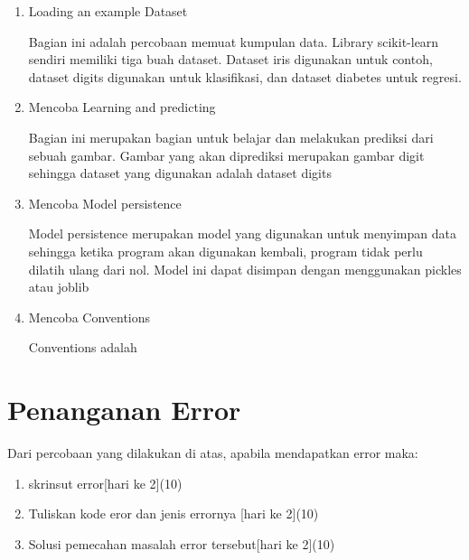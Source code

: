 \begin{enumerate}
	\item
	      Loading an example Dataset
	      \par \setlength{\parindent}{5ex}
	      Bagian ini adalah percobaan memuat kumpulan data. Library scikit-learn sendiri memiliki tiga buah dataset. Dataset iris digunakan untuk contoh, dataset digits digunakan untuk klasifikasi, dan dataset diabetes untuk regresi.
	      
	\item
	      Mencoba Learning and predicting
	      \par \setlength{\parindent}{5ex}
	      Bagian ini merupakan bagian untuk belajar dan melakukan prediksi dari sebuah gambar. Gambar yang akan diprediksi merupakan gambar digit sehingga dataset yang digunakan adalah dataset digits
	      
	\item
	      Mencoba Model persistence
	      \par \setlength{\parindent}{5ex}
	      Model persistence merupakan model yang digunakan untuk menyimpan data sehingga ketika program akan digunakan kembali, program tidak perlu dilatih ulang dari nol. Model ini dapat disimpan dengan menggunakan pickles atau joblib
	      
	\item
	      Mencoba Conventions
	      \par \setlength{\parindent}{5ex}
	      Conventions adalah
	      
\end{enumerate}


\section{Penanganan Error}
Dari percobaan yang dilakukan di atas, apabila mendapatkan error maka:

\begin{enumerate}
	\item
	      skrinsut error[hari ke 2](10)
	\item
	      Tuliskan kode eror dan jenis errornya [hari ke 2](10)
	\item
	      Solusi pemecahan masalah error tersebut[hari ke 2](10)

\end{enumerate}

